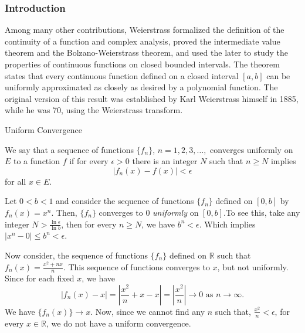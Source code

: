 \documentclass{beamer}
\begin{document}
\begin{frame}
\frametitle{Introduction}
Among many other contributions, Weierstrass formalized the definition of the continuity of a function and complex analysis, proved the intermediate value theorem and the Bolzano-Weierstrass theorem, and used the later to study the properties of continuous functions on closed bounded intervals. The theorem states that every continuous function defined on a closed interval $[a, b]$ can be uniformly approximated as closely as desired by a polynomial function. The original version of this result was established by Karl Weierstrass himself in 1885, while he was 70, using the Weierstrass transform.

\end{frame}
\begin{frame}{Uniform Convergence}
    \begin{definition}\cite{rudin1976principles}
    We say that a sequence of functions $\{f_n\}$, $n = 1, 2, 3, \dots, $ converges uniformly on $E$ to a function $f$ if for every $\epsilon > 0$ there is an integer $N$ such that $n \geq N$ implies
    \begin{equation}
        |f_n(x) - f(x)| < \epsilon
    \end{equation}
    for all $x \in E$.
\end{definition}
\pause
\begin{example}
    Let $0 < b < 1$ and consider the sequence of functions $\{f_n\}$ defined on $[0, b]$ by $f_n(x) = x^n$. Then, $\{f_n\}$ converges to $0$ \textit{uniformly} on $[0, b]$.To see this, take any integer $N > \frac{\ln{\epsilon}}{\ln{b}}$, then for every $n \geq N$, we have $b^n < \epsilon.$ Which implies $|x^n-0| \leq b^n < \epsilon$.
\end{example}
 \end{frame}
\begin{frame}
\begin{example}
    Now consider, the sequence of functions $\{f_n\}$ defined on $\mathbb{R}$ such that $f_n(x) = \frac{x^2+nx}{n}$. This sequence of functions converges to $x$, but not uniformly.
    Since for each fixed $x$, we have
    \begin{equation*}
        \vert f_n(x)-x\vert=\left|\frac{x^2}{n}+x-x\right| = \left|\frac{x^2}{n}\right|\rightarrow0 \text{ as } n \rightarrow \infty.
    \end{equation*}
    We have $\{f_n(x)\}\rightarrow x$. Now, since we cannot find any $n$ such that, $\frac{x^2}{n} < \epsilon$, for every $x \in \mathbb{R}$, we do not have a uniform convergence.
\end{example}
\end{frame}
\end{document}
